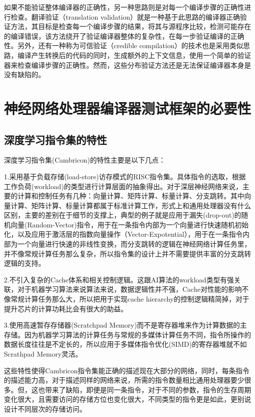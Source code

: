 如果不能验证整体编译器的正确性，另一种思路则是对每一个编译步骤的正确性进行检查。翻译验证（translation validation）就是一种基于此思路的编译器正确验证方法，其目标是检查每一个编译步骤的结果，将其与源程序比较，检测可能存在的编译错误，该方法绕开了验证编译器整体的复杂性，在每一步验证编译的正确性。另外，还有一种称为可信验证（credible compilation）的技术也是采用类似思路，编译产生转换后的代码的同时，生成额外的上下文信息，使用一个简单的验证器来检查编译步骤的正确性。然而，这些分布验证方法还是无法保证编译器本身是没有缺陷的。

\section{神经网络处理器编译器测试框架的必要性}

\subsection{深度学习指令集的特性}
深度学习指令集(Cambricon)的特性主要是以下几点：

1.采用基于负载存储(load-store)访存模式的RISC指令集。具体指令的选取，根据工作负荷(workload)的类型进行计算层面的抽象得出。对于深层神经网络来说，主要的计算和控制任务有几种：向量计算、矩阵计算、标量计算、分支跳转。其中向量计算、矩阵计算、标量计算都属于标准计算工作，形式上和通用处理器没有什么区别，主要的差别在于细节的支撑上，典型的例子就是应用于漏失(drop-out)的随机向量(Random-Vector)指令，用于在一条指令内部为一个向量进行快速随机初始化，以及应用于激活层的指数向量操作（Vector-Expotential），用于在一条指令内部为一个向量进行快速的非线性变换，而分支跳转的逻辑在神经网络计算任务里，并不像常规计算任务那么复杂，所以指令集的设计上并不需要提供丰富的分支跳转逻辑的支持。

2.不引入复杂的Cache体系和相关控制逻辑。这跟AI算法的workload类型有强关联，对于机器学习算法来说算法来说，数据逻辑性并不强，Cache对性能的影响不像常规计算任务那么大，所以把用于实现cache hierarchy的控制逻辑精简掉，对于提升芯片的计算功耗比会有很大的助益。

3.使用高速暂存存储器(Scratchpad Memory)而不是寄存器堆来作为计算数据的主存储。因为机器学习算法的计算任务与常规的多媒体计算任务不同，指令所操作的数据长度往往是不定长的，所以应用于多媒体指令优化(SIMD)的寄存器堆就不如Scrathpad Memory灵活。

这些特性使得Cambricon指令集能正确的描述现在大部分的网络，同时，每条指令的描述能力高，对于描述同样的网络来说，所需的指令数量相比通用处理器要少很多。但，这也带来了缺陷，即便是同一条指令，对于不同的参数，指令的生存周期变化很大，且需要访问的存储方位也变化很大，不同类型的指令更是如此，更别说设计不同层次的存储访问。

